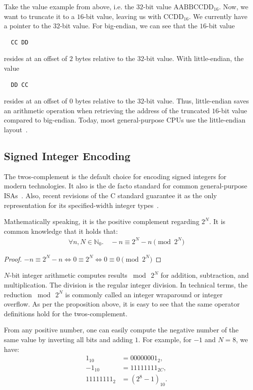 Take the value example from above, i.e. the $32$-bit value $\mathrm{AABBCCDD}_{16}$. Now, we want to truncate it to a $16$-bit value, leaving us with $\mathrm{CCDD}_{16}$. We currently have a pointer to the $32$-bit value. For \gls{big-endian}, we can see that the $16$-bit value
\begin{lstlisting}
  CC DD
\end{lstlisting}
resides at an offset of $2$ \glspl{byte} relative to the $32$-bit value. With \gls{little-endian}, the value
\begin{lstlisting}
  DD CC
\end{lstlisting}
resides at an offset of $0$ \glspl{byte} relative to the $32$-bit value. Thus, \gls{little-endian} saves an arithmetic operation when retrieving the address of the truncated $16$-bit value compared to \gls{big-endian}. Today, most general-purpose \glspl{CPU} use the \gls{little-endian} layout~\cite{ia32,arm-isa}.

\subsection{Signed Integer Encoding}

The \gls{twos-complement} is the default choice for encoding signed integers for modern technologies. It also is the de facto standard for common general-purpose \glspl{ISA}~\cite{ia32,arm-isa}. Also, recent revisions of the \gls{C} standard guarantee it as the only representation for its specified-width integer types~\cite{ISO:2018:III}.

Mathematically speaking, it is the positive complement regarding $2^N$. It is common knowledge that it holds that:
\begin{align*}
  \forall n,N \in \mathbb{N}_0. \quad -n \equiv 2^N - n \pmod{2^N}
\end{align*}
\begin{proof}
  $-n \equiv 2^N - n \Leftrightarrow 0 \equiv 2^N \Leftrightarrow 0 \equiv 0 \pmod{2^N}$
\end{proof}

$N$-bit integer arithmetic computes results $\bmod~2^N$ for addition, subtraction, and multiplication. The division is the regular integer division. In technical terms, the reduction $\bmod~2^N$ is commonly called an integer wraparound or integer overflow. As per the proposition above, it is easy to see that the same operator definitions hold for the \gls{twos-complement}.

From any positive number, one can easily compute the negative number of the same value by inverting all bits and adding $1$. For example, for $-1$ and $N = 8$, we have:
\begin{align*}
   1_{10} &= 00000001_2,\\
  -1_{10} &= 11111111_{2C},\\
  11111111_{2} &= (2^8 - 1)_{10}.
\end{align*}

